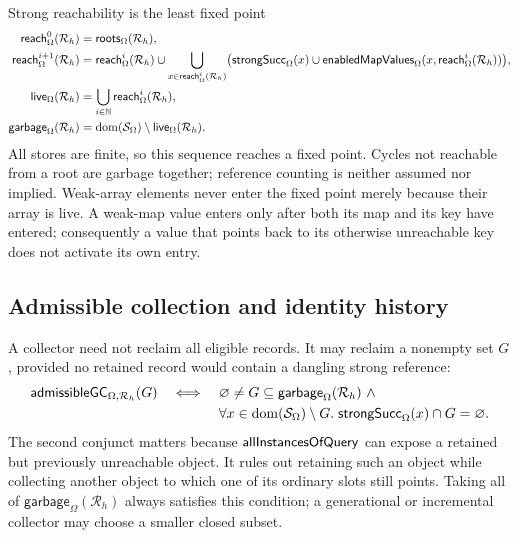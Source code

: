 Strong reachability is the least fixed point
\begin{equation}\label{eq:gc-reachability}
\begin{aligned}
 \mathsf{reach}^{0}_{\Omega}(\mathcal R_h)
   &=\mathsf{roots}_{\Omega}(\mathcal R_h),\\
 \mathsf{reach}^{i+1}_{\Omega}(\mathcal R_h)
   &=\mathsf{reach}^{i}_{\Omega}(\mathcal R_h)
     \cup\bigcup_{x\in\mathsf{reach}^{i}_{\Omega}(\mathcal R_h)}
       \bigl(\mathsf{strongSucc}_{\Omega}(x)
        \cup\mathsf{enabledMapValues}_{\Omega}
          (x,\mathsf{reach}^{i}_{\Omega}(\mathcal R_h))\bigr),\\
 \mathsf{live}_{\Omega}(\mathcal R_h)
   &=\bigcup_{i\in\mathbb N}\mathsf{reach}^{i}_{\Omega}(\mathcal R_h),\\
 \mathsf{garbage}_{\Omega}(\mathcal R_h)
   &=\mathop{\mathrm{dom}}(\mathcal S_\Omega)
       \setminus\mathsf{live}_{\Omega}(\mathcal R_h).
\end{aligned}
\end{equation}
All stores are finite, so this sequence reaches a fixed point.  Cycles not
reachable from a root are garbage together; reference counting is neither
assumed nor implied.  Weak-array elements never enter the fixed point merely
because their array is live.  A weak-map value enters only after both its map
and its key have entered; consequently a value that points back to its otherwise
unreachable key does not activate its own entry.

\subsection{Admissible collection and identity history}

A collector need not reclaim all eligible records.  It may reclaim a nonempty
set $G$, provided no retained record would contain a dangling strong reference:
\begin{equation}\label{eq:admissible-garbage-set}
\begin{split}
 \mathsf{admissibleGC}_{\Omega,\mathcal R_h}(G)
 \quad\Longleftrightarrow\quad{}
 &\varnothing\ne G\subseteq
     \mathsf{garbage}_{\Omega}(\mathcal R_h)\ \land\\
 &\forall x\in\mathop{\mathrm{dom}}(\mathcal S_\Omega)\setminus G.\;
      \mathsf{strongSucc}_{\Omega}(x)\cap G=\varnothing.
\end{split}
\end{equation}
The second conjunct matters because $\mathsf{allInstancesOfQuery}$ can expose a
retained but previously unreachable object.  It rules out retaining such an
object while collecting another object to which one of its ordinary slots
still points.  Taking all of $\mathsf{garbage}_{\Omega}(\mathcal R_h)$ always
satisfies this condition; a generational or incremental collector may choose a
smaller closed subset.

